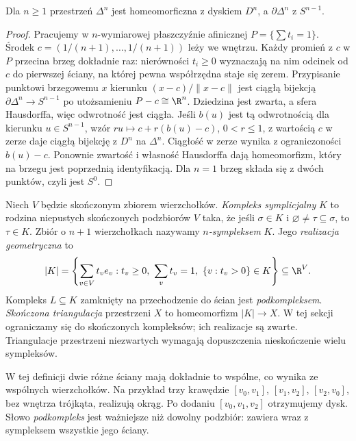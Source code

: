 \begin{stwierdzenie}
\label{prop:brzeg-sympleksu}
Dla $n\geq1$ przestrzeń $\Delta^n$
jest homeomorficzna z dyskiem $D^n$,
a $\partial\Delta^n$ z $S^{n-1}$.
\end{stwierdzenie}
\begin{proof}
Pracujemy w $n$-wymiarowej płaszczyźnie
afinicznej $P=\{\sum t_i=1\}$.
Środek $c=(1/(n+1),\ldots,1/(n+1))$
leży we wnętrzu. Każdy promień z $c$
w $P$ przecina brzeg dokładnie raz:
nierówności $t_i\geq0$ wyznaczają
na nim odcinek od $c$ do pierwszej
ściany, na której pewna współrzędna
staje się zerem.
Przypisanie punktowi brzegowemu
$x$ kierunku $(x-c)/\|x-c\|$
jest ciągłą bijekcją
$\partial\Delta^n\to S^{n-1}$
po utożsamieniu $P-c\cong\R^n$.
Dziedzina jest zwarta, a sfera
Hausdorffa, więc odwrotność jest
ciągła. Jeśli $b(u)$ jest tą odwrotnością dla kierunku
$u\in S^{n-1}$, wzór $ru\mapsto c+r(b(u)-c)$, $0<r\leq1$,
z wartością $c$ w zerze daje ciągłą bijekcję z $D^n$ na $\Delta^n$.
Ciągłość w zerze wynika z ograniczoności $b(u)-c$.
Ponownie zwartość i własność Hausdorffa dają homeomorfizm,
który na brzegu jest poprzednią identyfikacją. Dla $n=1$ brzeg
składa się z dwóch punktów,
czyli jest $S^0$.
\end{proof}

\begin{definicja}
\label{def:kompleks-symplicjalny}
Niech $V$ będzie skończonym zbiorem
wierzchołków. \emph{Kompleks symplicjalny}
$K$ to rodzina niepustych skończonych
podzbiorów $V$ taka, że jeśli
$\sigma\in K$ i $\varnothing\ne\tau\subseteq\sigma$,
to $\tau\in K$. Zbiór o $n+1$
wierzchołkach nazywamy
\emph{$n$-sympleksem} $K$.
Jego \emph{realizacja geometryczna} to
\[
 |K|=\left\{\sum_{v\in V}t_v e_v:
 t_v\geq0,\ \sum_v t_v=1,\
 \{v:t_v>0\}\in K\right\}\subseteq\R^{V}.
\]
Kompleks $L\subseteq K$ zamknięty
na przechodzenie do ścian jest
\emph{podkompleksem}.
\emph{Skończona triangulacja} przestrzeni $X$
to homeomorfizm $|K|\to X$. W tej sekcji ograniczamy się do
skończonych kompleksów; ich realizacje są zwarte. Triangulacje
przestrzeni niezwartych wymagają dopuszczenia nieskończenie wielu sympleksów.
\end{definicja}

W tej definicji dwie różne ściany
mają dokładnie to wspólne, co
wynika ze wspólnych wierzchołków.
Na przykład trzy krawędzie
$[v_0,v_1]$, $[v_1,v_2]$,
$[v_2,v_0]$, bez wnętrza trójkąta,
realizują okrąg. Po dodaniu
$[v_0,v_1,v_2]$ otrzymujemy dysk.
Słowo \emph{podkompleks} jest
ważniejsze niż dowolny podzbiór:
zawiera wraz z sympleksem
wszystkie jego ściany.


